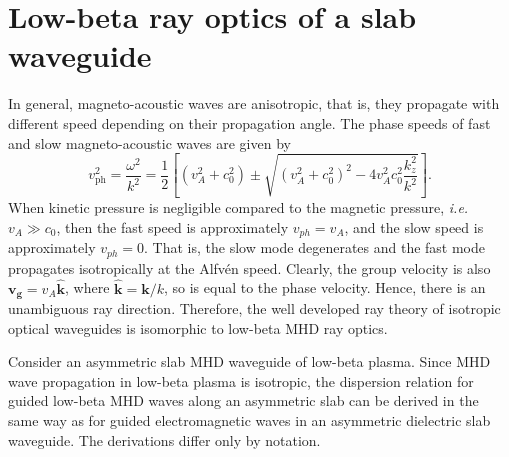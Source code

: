 \documentclass[12pt]{../style-files/ociamthesis}
\begin{document}
	
	\section{Low-beta ray optics of a slab waveguide}
	\label{sec: low beta}
	
	In general, magneto-acoustic waves are anisotropic, that is, they propagate with different speed depending on their propagation angle. The phase speeds of fast and slow magneto-acoustic waves are given by
	\begin{equation}
	v_\mathrm{ph}^2 = \frac{\omega^2}{k^2} = \frac{1}{2}\left[ (v_A^2 + c_0^2) \pm \sqrt{(v_A^2 + c_0^2)^2 - 4v_A^2c_0^2\frac{k_z^2}{k^2}} \right]. \label{MHD DR}
	\end{equation}
	When kinetic pressure is negligible compared to the magnetic pressure, \textit{i.e.} $v_A \gg c_0$, then the fast speed is approximately $v_{ph} = v_A$, and the slow speed is approximately $v_{ph} = 0$. That is, the slow mode degenerates and the fast mode propagates isotropically at the Alfv\'{e}n speed. Clearly, the group velocity is also $\mathbf{v_g} = v_A \mathbf{\hat{k}}$, where $\mathbf{\hat{k}} = \mathbf{k}/k$, so is equal to the phase velocity. Hence, there is an unambiguous ray direction. Therefore, the well developed ray theory of isotropic optical waveguides is isomorphic to low-beta MHD ray optics.
	
	Consider an asymmetric slab MHD waveguide of low-beta plasma. Since MHD wave propagation in low-beta plasma is isotropic, the dispersion relation for guided low-beta MHD waves along an asymmetric slab can be derived in the same way as for guided electromagnetic waves in an asymmetric dielectric slab waveguide. The derivations differ only by notation.
	
\end{document}
